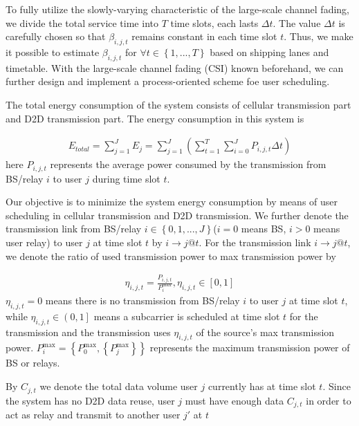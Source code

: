 \documentclass{ieeeaccess}
\begin{document}
To fully utilize the slowly-varying characteristic of the large-scale channel fading, we divide the total service time into $T$ time slots, each lasts $\Delta t$. The value $\Delta t$ is carefully chosen so that $\beta _{i,j,t}$ remains constant in each time slot $t$. Thus, we make it possible to estimate $\beta _{i,j,t}$ for $\forall t \in \left\{ {1,...,T} \right\}$ based on shipping lanes and timetable. With the large-scale channel fading (CSI) known beforehand, we can further design and implement a process-oriented scheme foe user scheduling.

The total energy consumption of the system consists of cellular transmission part and D2D transmission part. The energy consumption in this system is

\begin{align}
{{E_{total}} = \sum\limits_{j = 1}^J {{E_j}}  = \sum\limits_{j = 1}^J {\left( {\sum\limits_{t = 1}^T {\sum\limits_{i = 0}^J {{P_{i,j,t}}\Delta t} } } \right)} }
\end{align}
here ${P_{i,j,t}}$ represents the average power consumed by the transmission from BS/relay $i$ to user $j$ during time slot $t$.

Our objective is to minimize the system energy consumption by means of user scheduling in cellular transmission and D2D transmission. We further denote the transmission link from BS/relay $i \in \left\{ {0,1,...,J} \right\}$($i = 0$ means BS, $i > 0$ means user relay) to user $j$ at time slot $t$ by $i \to j@t$. For the transmission link $i \to j@t$, we denote the ratio of used transmission power to max transmission power by 

\begin{align}
{{\eta _{i,j,t}} = \frac{{{P_{i,j,t}}}}{{P_i^{\max }}},{\eta _{i,j,t}} \in \left[ {0,1} \right]}
\end{align}
${\eta _{i,j,t}} = 0$ means there is no transmission from BS/relay $i$ to user $j$ at time slot $t$, while ${\eta _{i,j,t}} \in \left( {0,1} \right]$ means a subcarrier is scheduled at time slot $t$ for the transmission and the transmission uses ${\eta _{i,j,t}}$ of the source's max transmission power. $P_i^{\max } = \left\{ {P_0^{\max },\left\{ {P_j^{\max }} \right\}} \right\}$ represents the maximum transmission power of BS or relays. 

By ${C_{j,t}}$ we denote the total data volume user $j$ currently has at time slot $t$. Since the system has no D2D data reuse, user $j$ must have enough data ${C_{j,t}}$ in order to act as relay and transmit to another user $j'$ at $t$
\end{document}
